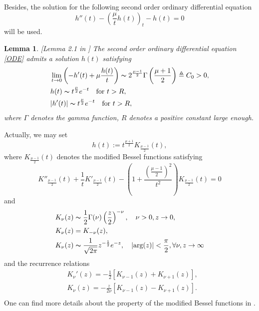 \documentclass[review]{elsarticle}
\newtheorem{lem}[thm]{Lemma}
\begin{document}
Besides, the solution for the following second order ordinary differential equation \begin{equation}
\label{ODE}
h''(t)-\left(\frac{\mu}{t}h(t)\right)_t-h(t)=0
\end{equation}
will be used.
\begin{lem}\label{ODE1}[Lemma 2.1 in \cite{FLT}]
The second order ordinary differential equation \eqref{ODE} admits a solution $h(t)$ satisfying
\begin{equation}\label{beode}
\begin{aligned}
& \lim_{t\rightarrow 0}\left(-h'(t)+\mu\frac{h(t)}{t}\right)\thicksim 2^{\frac{\mu-1}{2}}\Gamma\left(\frac{\mu+1}{2}\right)\triangleq C_0>0,\\
&h(t)\thicksim t^{\frac{\mu}2}e^{-t}\quad\mbox{for}\ t>R,\\
&|h'(t)|\thicksim t^{\frac{\mu}2}e^{-t}\quad\mbox{for}\ t>R,\\
\end{aligned}
\end{equation}
where $\Gamma$ denotes the gamma function, $R$ denotes a positive constant large enough.
\end{lem}
Actually, we may set
\begin{equation}\label{Kmu}
h(t):=t^{\frac{\mu+1}{2}}K_{\frac{\mu-1}{2}}(t),
\end{equation}
where $K_{\frac{\mu-1}{2}}(t)$ denotes the modified Bessel functions satisfying
\begin{equation}
\label{bessel}
K''_{\frac{\mu-1}{2}}(t)+\frac1tK'_{\frac{\mu-1}{2}}(t)-\left(1+\frac{\left(
\frac{\mu-1}2\right)^2}{t^2}\right)K_{\frac{\mu-1}{2}}(t)=0
\end{equation}
and
\begin{equation}\label{Bes}
\begin{aligned}
&K_\nu(z)\thicksim \frac12\Gamma(\nu)\left(\frac z2\right)^{-\nu},~~~\nu>0, z\rightarrow 0,\\
&K_{\nu}(z)=K_{-\nu}(z),\\
&K_\nu(z)\thicksim \frac{1}{\sqrt{2\pi}}z^{-\frac12}e^{-z},~~~|\mbox{arg}(z)|<\frac{\pi}2,\forall \nu, z\rightarrow \infty\\
\end{aligned}
\end{equation}
and the recurrence relations
\begin{equation}\label{rela}
\begin{aligned}
&K_\nu'(z)=-\frac12\left[K_{\nu-1}(z)+K_{\nu+1}(z)\right],\\
&K_\nu(z)=-\frac{z}{2\nu}\left[K_{\nu-1}(z)-K_{\nu+1}(z)\right].\\
\end{aligned}
\end{equation}
One can find more details about the property of the modified Bessel functions in \cite{Abr}.
\end{document}
